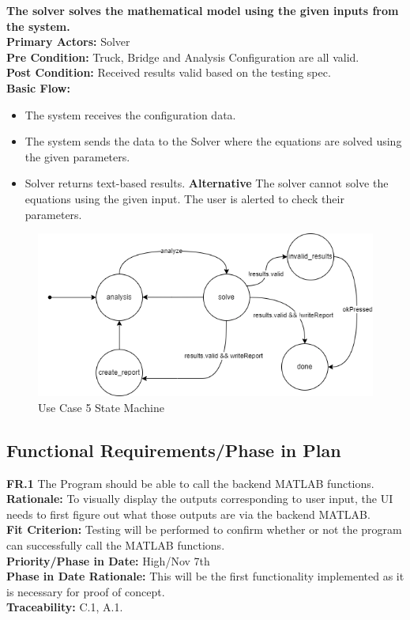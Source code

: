 \documentclass[12pt]{article}
\begin{document}
\noindent
\textbf{The solver solves the mathematical model using the given inputs from the system.} \\
\textbf{  Primary Actors:} Solver\\
\textbf{  Pre Condition:} Truck, Bridge and Analysis Configuration are all valid.\\
\textbf{  Post Condition:} Received results valid based on the testing spec.\\ 
\textbf{  Basic Flow:} 
\begin{itemize}
\item The system receives the configuration data. 
\item The system sends the data to the Solver where the equations are solved using the given parameters. 
\item Solver returns text-based results. 
\subitem \textbf{Alternative} The solver cannot solve the equations using the given input. The user is alerted to check their parameters. 
\end{itemize}
\begin{figure}[H]
  \centering
  \includegraphics[width=0.5\linewidth]{use-case-5-sm.png}
  \caption{Use Case 5 State Machine}
  \label {fig:use-case-5-sm}
\end{figure}

\subsection{Functional Requirements/Phase in Plan}
  \textbf{FR.1} The Program should be able to call the backend MATLAB functions. \\
  \textbf{Rationale:} To visually display the outputs corresponding to user input, the UI needs to first figure out what those outputs are via the backend MATLAB.\\
  \textbf{Fit Criterion:} Testing will be performed to confirm whether or not the program can successfully call the MATLAB functions.\\
  \textbf{Priority/Phase in Date:} High/Nov 7th\\
  \textbf{Phase in Date Rationale:} This will be the first functionality implemented as it is necessary for proof of concept.\\
  \textbf{Traceability:} C.1, A.1.\\\\
  
\end{document}
